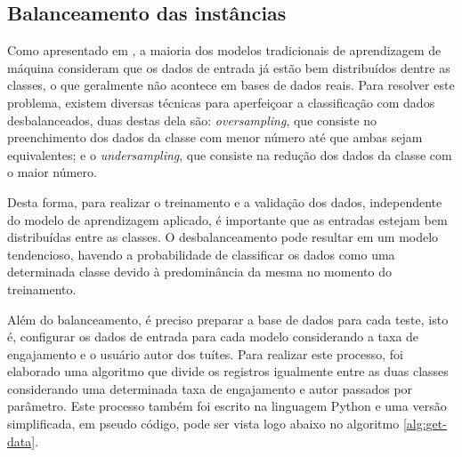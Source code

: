 \documentclass[oneside,openright,12pt]{ufsm_2015} %
\begin{document}

\subsection{Balanceamento das instâncias}
\label{sec:class-balanceamento}
    
    \par Como apresentado em \cite{book:han:11}, a maioria dos modelos tradicionais de aprendizagem de máquina consideram que os dados de entrada já estão bem distribuídos dentre as classes, o que geralmente não acontece em bases de dados reais. Para resolver este problema, existem diversas técnicas para aperfeiçoar a classificação com dados desbalanceados, duas destas dela são: \textit{oversampling}, que consiste no preenchimento dos dados da classe com menor número até que ambas sejam equivalentes; e o \textit{undersampling}, que consiste na redução dos dados da classe com o maior número.
    
    \par Desta forma, para realizar o treinamento e a validação dos dados, independente do modelo de aprendizagem aplicado, é importante que as entradas estejam bem distribuídas entre as classes. O desbalanceamento pode resultar em um modelo tendencioso, havendo a probabilidade de classificar os dados como uma determinada classe devido à predominância da mesma no momento do treinamento.

    \par Além do balanceamento, é preciso preparar a base de dados para cada teste, isto é, configurar os dados de entrada para cada modelo considerando a taxa de engajamento e o usuário autor dos tuítes. Para realizar este processo, foi elaborado uma algoritmo que divide os registros igualmente entre as duas classes considerando uma determinada taxa de engajamento e autor passados por parâmetro. Este processo também foi escrito na linguagem Python e uma versão simplificada, em pseudo código, pode ser vista logo abaixo no algoritmo \ref{alg:get-data}.
    
\end{document}
